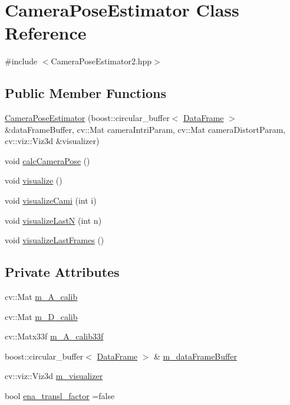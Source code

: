 \hypertarget{classCameraPoseEstimator}{}\section{Camera\+Pose\+Estimator Class Reference}
\label{classCameraPoseEstimator}


{\ttfamily \#include $<$Camera\+Pose\+Estimator2.\+hpp$>$}

\subsection*{Public Member Functions}
\begin{DoxyCompactItemize}
\item 
\hyperlink{classCameraPoseEstimator_a441b62732e43db66f31cb231cd6a0f68}{Camera\+Pose\+Estimator} (boost\+::circular\+\_\+buffer$<$ \hyperlink{structDataFrame}{Data\+Frame} $>$ \&data\+Frame\+Buffer, cv\+::\+Mat camera\+Intri\+Param, cv\+::\+Mat camera\+Distort\+Param, cv\+::viz\+::\+Viz3d \&visualizer)
\item 
void \hyperlink{classCameraPoseEstimator_a2ffa3353dc0ca9913a35c3c018cf19da}{calc\+Camera\+Pose} ()
\item 
void \hyperlink{classCameraPoseEstimator_ac1b95d78d7d3f4c8032d8e494034420c}{visualize} ()
\item 
void \hyperlink{classCameraPoseEstimator_a77d2c2226c4f11ec9e65f3552086abff}{visualize\+Cami} (int i)
\item 
void \hyperlink{classCameraPoseEstimator_af77110f690dea3934f419858cd89fb3b}{visualize\+LastN} (int n)
\item 
void \hyperlink{classCameraPoseEstimator_a8d19513e75924b7e3e56e79a97c534a5}{visualize\+Last\+Frames} ()
\end{DoxyCompactItemize}
\subsection*{Private Attributes}
\begin{DoxyCompactItemize}
\item 
cv\+::\+Mat \hyperlink{classCameraPoseEstimator_a399cc39501f20c5fb80ca5010041ae20}{m\+\_\+\+A\+\_\+calib}
\item 
cv\+::\+Mat \hyperlink{classCameraPoseEstimator_a794f0ecbbbb73d92878c04c757adfe69}{m\+\_\+\+D\+\_\+calib}
\item 
cv\+::\+Matx33f \hyperlink{classCameraPoseEstimator_a8147e1e69f66b58e6d84fa4999045c58}{m\+\_\+\+A\+\_\+calib33f}
\item 
boost\+::circular\+\_\+buffer$<$ \hyperlink{structDataFrame}{Data\+Frame} $>$ \& \hyperlink{classCameraPoseEstimator_aba5c3d97eb6188c08a7b0121c38d1f76}{m\+\_\+data\+Frame\+Buffer}
\item 
cv\+::viz\+::\+Viz3d \hyperlink{classCameraPoseEstimator_ac2465c62e9e4937183fd77e9788d9f8b}{m\+\_\+visualizer}
\item 
bool \hyperlink{classCameraPoseEstimator_a78bb2fadb2826d7ec83d756be0b0fa92}{ena\+\_\+transl\+\_\+factor} =false
\end{DoxyCompactItemize}


